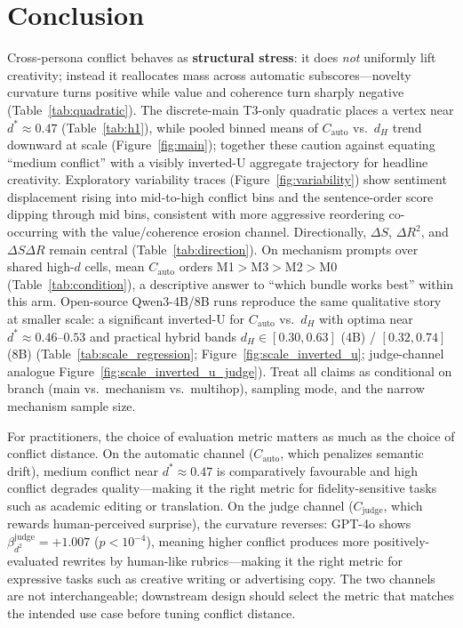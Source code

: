 \documentclass[sigconf,nonacm]{acmart}
\begin{document}
\section{Conclusion}

Cross-persona conflict behaves as \textbf{structural stress}: it does \emph{not} uniformly lift creativity; instead it reallocates mass across automatic subscores---novelty curvature turns positive while value and coherence turn sharply negative (Table~\ref{tab:quadratic}). The discrete-main T3-only quadratic places a vertex near $d^\ast{\approx}0.47$ (Table~\ref{tab:h1}), while pooled binned means of $C_{\mathrm{auto}}$ vs.\ $d_H$ trend downward at scale (Figure~\ref{fig:main}); together these caution against equating ``medium conflict'' with a visibly inverted-U aggregate trajectory for headline creativity.
Exploratory variability traces (Figure~\ref{fig:variability}) show sentiment displacement rising into mid-to-high conflict bins and the sentence-order score dipping through mid bins, consistent with more aggressive reordering co-occurring with the value/coherence erosion channel.
Directionally, $\Delta S$, $\Delta R^2$, and $\Delta S\Delta R$ remain central (Table~\ref{tab:direction}). On mechanism prompts over shared high-$d$ cells, mean $C_{\mathrm{auto}}$ orders M1${>}$M3${>}$M2${>}$M0 (Table~\ref{tab:condition}), a descriptive answer to ``which bundle works best'' within this arm.
Open-source Qwen3-4B/8B runs reproduce the same qualitative story at smaller scale: a significant inverted-U for $C_{\mathrm{auto}}$ vs.\ $d_H$ with optima near $d^\ast{\approx}0.46$--$0.53$ and practical hybrid bands $d_H\in[0.30,0.63]$ (4B) / $[0.32,0.74]$ (8B) (Table~\ref{tab:scale_regression}; Figure~\ref{fig:scale_inverted_u}; judge-channel analogue Figure~\ref{fig:scale_inverted_u_judge}).
Treat all claims as conditional on branch (main vs.\ mechanism vs.\ multihop), sampling mode, and the narrow mechanism sample size.

For practitioners, the choice of evaluation metric matters as much as the choice of conflict distance. On the automatic channel ($C_{\mathrm{auto}}$, which penalizes semantic drift), medium conflict near $d^\ast{\approx}0.47$ is comparatively favourable and high conflict degrades quality---making it the right metric for fidelity-sensitive tasks such as academic editing or translation. On the judge channel ($C_{\mathrm{judge}}$, which rewards human-perceived surprise), the curvature reverses: GPT-4o shows $\beta_{d^2}^{\mathrm{judge}}{=}{+}1.007$ ($p{<}10^{-4}$), meaning higher conflict produces more positively-evaluated rewrites by human-like rubrics---making it the right metric for expressive tasks such as creative writing or advertising copy. The two channels are not interchangeable; downstream design should select the metric that matches the intended use case before tuning conflict distance.
\end{document}
